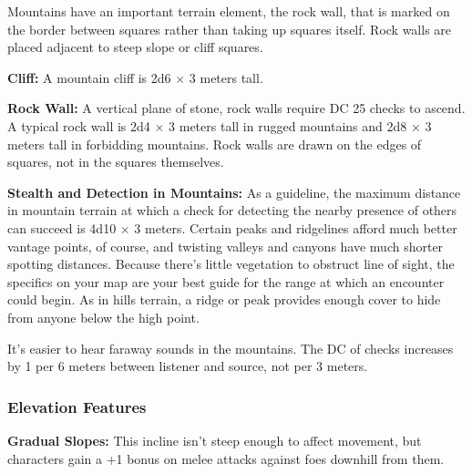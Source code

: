 Mountains have an important terrain element, the rock wall, that is marked on the border between squares rather than taking up squares itself. Rock walls are placed adjacent to steep slope or cliff squares.


\textbf{Cliff:} A mountain cliff is 2d6 $\times$ 3 meters tall.

\textbf{Rock Wall:} A vertical plane of stone, rock walls require DC 25  checks to ascend. A typical rock wall is 2d4 $\times$ 3 meters tall in rugged mountains and 2d8 $\times$ 3 meters tall in forbidding mountains. Rock walls are drawn on the edges of squares, not in the squares themselves.

\textbf{Stealth and Detection in Mountains:} As a guideline, the maximum distance in mountain terrain at which a  check for detecting the nearby presence of others can succeed is 4d10 $\times$ 3 meters. Certain peaks and ridgelines afford much better vantage points, of course, and twisting valleys and canyons have much shorter spotting distances. Because there's little vegetation to obstruct line of sight, the specifics on your map are your best guide for the range at which an encounter could begin. As in hills terrain, a ridge or peak provides enough cover to hide from anyone below the high point.

It's easier to hear faraway sounds in the mountains. The DC of  checks increases by 1 per 6 meters between listener and source, not per 3 meters.

\subsubsection{Elevation Features}
\textbf{Gradual Slopes:} This incline isn't steep enough to affect movement, but characters gain a +1 bonus on melee attacks against foes downhill from them.

